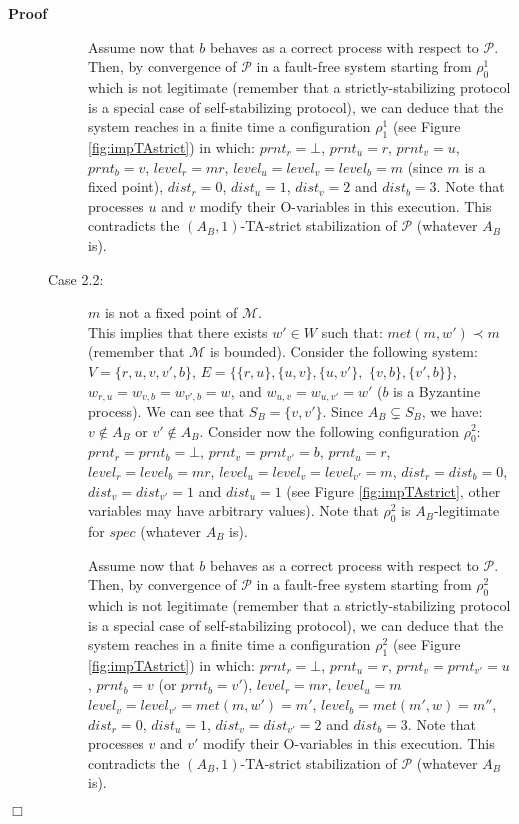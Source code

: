 \documentclass[11pt]{article}
\newenvironment{proof}{\noindent\textbf{Proof}}{\hfill\qed}
\newcommand{\qed}{\hfill$\Box$}
\begin{document}
\begin{proof}
\begin{description}
\begin{description}
Assume now that $b$ behaves as a correct process with respect to $\mathcal{P}$. Then, by convergence of $\mathcal{P}$ in a fault-free system starting from $\rho_0^1$ which is not legitimate (remember that a strictly-stabilizing protocol is a special case of self-stabilizing protocol), we can deduce that the system reaches in a finite time a configuration $\rho_1^1$ (see Figure \ref{fig:impTAstrict}) in which: $prnt_r=\bot$, $prnt_u=r$, $prnt_v=u$, $prnt_b=v$, $level_r=mr$, $level_u=level_v=level_b=m$ (since $m$ is a fixed point), $dist_r=0$, $dist_u=1$, $dist_v=2$ and $dist_b=3$. Note that processes $u$ and $v$ modify their O-variables in this execution. This contradicts the $(A_B,1)$-TA-strict stabilization of $\mathcal{P}$ (whatever $A_B$ is).
\item[Case 2.2:] $m$ is not a fixed point of $\mathcal{M}$.\\
This implies that there exists $w'\in W$ such that: $met(m,w')\prec m$ (remember that $\mathcal{M}$ is bounded). Consider the following system: $V=\{r,u,v,v',b\}$, $E=\{\{r,u\},\{u,v\},\{u,v'\},$ $\{v,b\},\{v',b\}\}$, $w_{r,u}=w_{v,b}=w_{v',b}=w$, and $w_{u,v}=w_{u,v'}=w'$ ($b$ is a Byzantine process). We can see that $S_B=\{v,v'\}$. Since $A_B\varsubsetneq S_B$, we have: $v\notin A_B$ or $v'\notin A_B$. Consider now the following configuration $\rho_0^2$: $prnt_r=prnt_b=\bot$, $prnt_v=prnt_{v'}=b$, $prnt_u=r$, $level_r=level_b=mr$, $level_u=level_v=level_{v'}=m$, $dist_r=dist_b=0$, $dist_v=dist_{v'}=1$ and $dist_u=1$ (see Figure \ref{fig:impTAstrict}, other variables may have arbitrary values). Note that $\rho_0^2$ is $A_B$-legitimate for $spec$ (whatever $A_B$ is).

Assume now that $b$ behaves as a correct process with respect to $\mathcal{P}$. Then, by convergence of $\mathcal{P}$ in a fault-free system starting from $\rho_0^2$ which is not legitimate (remember that a strictly-stabilizing protocol is a special case of self-stabilizing protocol), we can deduce that the system reaches in a finite time a configuration $\rho_1^2$ (see Figure \ref{fig:impTAstrict}) in which: $prnt_r=\bot$, $prnt_u=r$, $prnt_v=prnt_{v'}=u$, $prnt_b=v$ (or $prnt_b=v'$), $level_r=mr$, $level_u=m$ $level_v=level_{v'}=met(m,w')=m'$, $level_b=met(m',w)=m''$, $dist_r=0$, $dist_u=1$, $dist_v=dist_{v'}=2$ and $dist_b=3$. Note that processes $v$ and $v'$ modify their O-variables in this execution. This contradicts the $(A_B,1)$-TA-strict stabilization of $\mathcal{P}$ (whatever $A_B$ is).
\end{description}
\end{description}
\end{proof}
\end{document}
